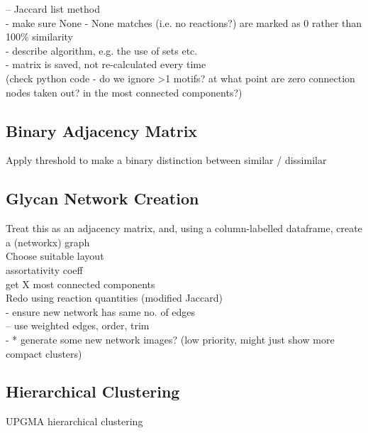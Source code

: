 \documentclass[12pt,a4paper]{article}
\begin{document}
-- Jaccard list method\\
- make sure None - None matches (i.e. no reactions?) are marked as 0 rather than 100\% similarity\\
- describe algorithm, e.g. the use of sets etc.\\
- matrix is saved, not re-calculated every time\\

(check python code - do we ignore >1 motifs? at what point are zero connection nodes taken out? in the most connected components?)\\

\subsection{Binary Adjacency Matrix}
\label{sec:thresholding}

Apply threshold to make a binary distinction between similar / dissimilar \\

\subsection{Glycan Network Creation}
\label{sec:network_creation}

Treat this as an adjacency matrix, and, using a column-labelled dataframe, create a (networkx) graph\\

Choose suitable layout\\

assortativity coeff\\

get X most connected components \\

Redo using reaction quantities (modified Jaccard)\\
- ensure new network has same no. of edges\\
-- use weighted edges, order, trim\\
- * generate some new network images? (low priority, might just show more compact clusters) \\

\subsection{Hierarchical Clustering}
\label{sec:clustering}

UPGMA hierarchical clustering\\
\end{document}
